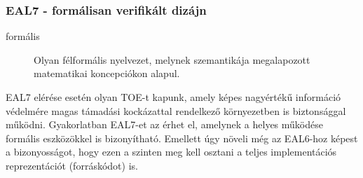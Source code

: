 \subsubsection{EAL7 - formálisan verifikált dizájn}
\begin{description}
    \item[formális]{Olyan félformális nyelvezet, melynek szemantikája megalapozott matematikai
        koncepciókon alapul.}
\end{description}

EAL7 elérése esetén olyan TOE-t kapunk, amely képes nagyértékű információ védelmére magas támadási
kockázattal rendelkező környezetben is biztonsággal működni. Gyakorlatban EAL7-et az érhet el,
amelynek a helyes működése formális eszközökkel is bizonyítható.
Emellett úgy növeli még az EAL6-hoz képest a bizonyosságot, hogy ezen a szinten meg kell osztani
a teljes implementációs reprezentációt (forráskódot) is.

